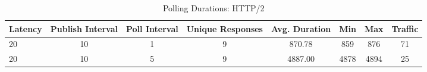 
\begin{table}[H]
    \small\sffamily\centering\renewcommand{\arraystretch}{1.2}
    \caption{Polling Durations: HTTP/2}
    \label{undefined}

    
    \begin{tabular}{l|ccccccc}
        \hline
        \rowcolor{tableheadcolor}
         \bfseries Latency                                                    & \bfseries Publish Interval                                                                                                                                     & \bfseries Poll Interval                                                                                                          & \bfseries Unique Responses                                                                                                                                     & \bfseries Avg. Duration                                                                                                          & \bfseries Min                & \bfseries Max                & \bfseries Traffic                                                    \\
        \hline
 20                                                                   & 10                                                                                                                                                             & 1                                                                                                                                & 9                                                                                                                                                              & 870.78                                                                                                                           & 859                          & 876                          & 71                                                                   \\
 20                                                                   & 10                                                                                                                                                             & 5                                                                                                                                & 9                                                                                                                                                              & 4887.00                                                                                                                          & 4878                         & 4894                         & 25                                                                   \\

\end{tabular}
\end{table}
